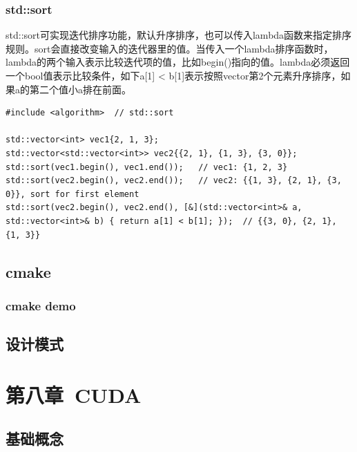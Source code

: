 \documentclass[12pt]{book}
\begin{document}
\subsection{std::sort}
std::sort可实现迭代排序功能，默认升序排序，也可以传入lambda函数来指定排序规则。sort会直接改变输入的迭代器里的值。当传入一个lambda排序函数时，lambda的两个输入表示比较迭代项的值，比如begin()指向的值。lambda必须返回一个bool值表示比较条件，如下a[1] < b[1]表示按照vector第2个元素升序排序，如果a的第二个值小a排在前面。
\begin{lstlisting}
#include <algorithm>  // std::sort

std::vector<int> vec1{2, 1, 3};
std::vector<std::vector<int>> vec2{{2, 1}, {1, 3}, {3, 0}};
std::sort(vec1.begin(), vec1.end());   // vec1: {1, 2, 3}
std::sort(vec2.begin(), vec2.end());   // vec2: {{1, 3}, {2, 1}, {3, 0}}, sort for first element
std::sort(vec2.begin(), vec2.end(), [&](std::vector<int>& a, std::vector<int>& b) { return a[1] < b[1]; });  // {{3, 0}, {2, 1}, {1, 3}}
\end{lstlisting}

\section{cmake}
\subsection{cmake demo}
\section{设计模式}

\newpage

\fancyhead{}

\chapter{第八章\ CUDA}
\section{基础概念}
\end{document}
